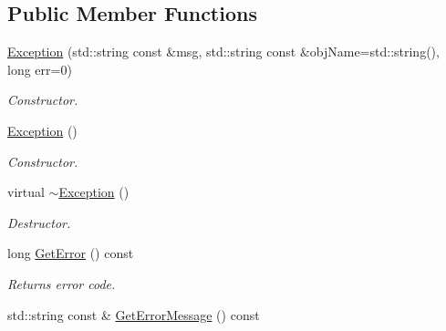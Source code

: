 \subsection*{Public Member Functions}
\begin{DoxyCompactItemize}
\item 
\hyperlink{class_common_1_1_exception_a7a4159db2c3f4d33a1190135a0eb47e8}{Exception} (std\-::string const \&msg, std\-::string const \&obj\-Name=std\-::string(), long err=0)
\begin{DoxyCompactList}\small\item\em Constructor. \end{DoxyCompactList}\item 
\hypertarget{class_common_1_1_exception_acbd14afa1f0d9dfb758c0a31e7768798}{\hyperlink{class_common_1_1_exception_acbd14afa1f0d9dfb758c0a31e7768798}{Exception} ()}\label{class_common_1_1_exception_acbd14afa1f0d9dfb758c0a31e7768798}

\begin{DoxyCompactList}\small\item\em Constructor. \end{DoxyCompactList}\item 
\hypertarget{class_common_1_1_exception_aab197db6aa257d1b8cb6d68254d8e89f}{virtual \hyperlink{class_common_1_1_exception_aab197db6aa257d1b8cb6d68254d8e89f}{$\sim$\-Exception} ()}\label{class_common_1_1_exception_aab197db6aa257d1b8cb6d68254d8e89f}

\begin{DoxyCompactList}\small\item\em Destructor. \end{DoxyCompactList}\item 
\hypertarget{class_common_1_1_exception_adb47456874a4768b53b142cebdb04ccc}{long \hyperlink{class_common_1_1_exception_adb47456874a4768b53b142cebdb04ccc}{Get\-Error} () const }\label{class_common_1_1_exception_adb47456874a4768b53b142cebdb04ccc}

\begin{DoxyCompactList}\small\item\em Returns error code. \end{DoxyCompactList}\item 
\hypertarget{class_common_1_1_exception_a25042768a5180ba186b4444bcee7b59c}{std\-::string const \& \hyperlink{class_common_1_1_exception_a25042768a5180ba186b4444bcee7b59c}{Get\-Error\-Message} () const }\label{class_common_1_1_exception_a25042768a5180ba186b4444bcee7b59c}


\end{DoxyCompactItemize}
